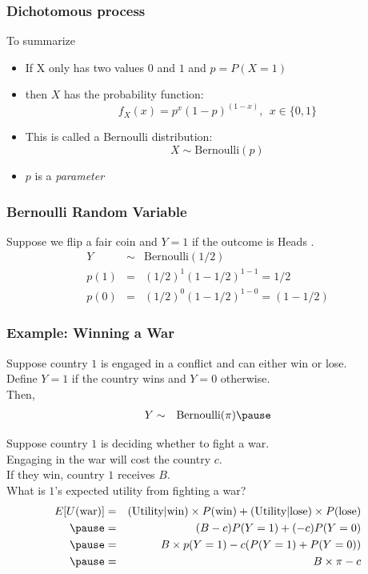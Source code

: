 \documentclass{beamer}
\numberwithin{equation}{section}
\begin{document}
\begin{frame}
\frametitle{Dichotomous process}

To summarize
\begin{itemize}
\item If X only has two values $0$ and $1$ and $p=P(X=1)$
\item[] then $X$ has the probability function:
$$f_X(x)=p^x(1-p)^{(1-x)},\ \ x\in \{0,1\}$$
\pause
\item This is called a Bernoulli distribution:
$$X\sim \text{Bernoulli}(p)$$
\item $p$ is a \emph{parameter}
\end{itemize}
\end{frame}



\begin{frame}
\frametitle{Bernoulli Random Variable}

Suppose we flip a fair coin and $Y = 1$ if the outcome is Heads . \\

\begin{eqnarray}
Y & \sim & \text{Bernoulli}(1/2) \nonumber \\
p(1) & = & (1/2)^{1} (1- 1/2)^{ 1- 1} = 1/2 \nonumber \\
p(0) & = & (1/2)^{0} (1- 1/2)^{1 - 0} = (1- 1/2) \nonumber 
\end{eqnarray}



\end{frame}


\begin{frame}
\frametitle{Example: Winning a War}

Suppose country $1$ is engaged in a conflict and can either win or lose. \pause  \\
Define $Y = 1$ if the country wins and $Y = 0$ otherwise.\\ \pause 
Then,  \pause 
\begin{eqnarray}
Y &\sim & \text{Bernoulli}(\pi) \nonumber \pause 
\end{eqnarray}


Suppose country $1$ is deciding whether to fight a war.  \\\pause 
Engaging in the war will cost the country $c$.  \\ \pause 
If they win, country $1$ receives $B$.  \\ \pause 
What is $1$'s expected utility from fighting a war?\\ \pause 
\begin{eqnarray}
E[U(\text{war})] & = & (\text{Utility}|\text{win})\times P(\text{win}) + (\text{Utility}| \text{lose})\times P(\text{lose}) \nonumber \\ \pause 
&= & (B - c) P(Y = 1) + (- c) P(Y = 0 )\nonumber \\ \pause 
& = & B \times p(Y = 1)  - c(P(Y = 1)  + P(Y = 0)) \nonumber \\ \pause 
& = & B \times \pi - c \nonumber 
\end{eqnarray}
\pause 

\end{frame}
\end{document}
